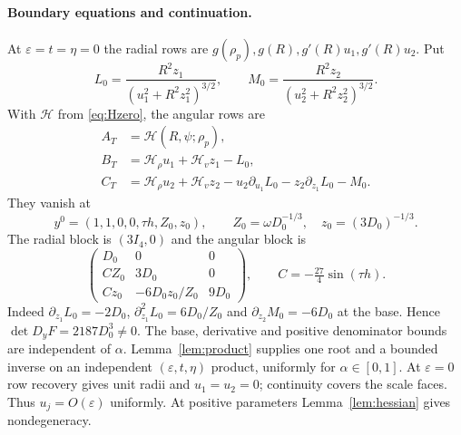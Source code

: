 \documentclass[11pt,a4paper]{article}
\numberwithin{equation}{section}
\theoremstyle{remark}
\newcommand{\eps}{\varepsilon}
\begin{document}
\paragraph{Boundary equations and continuation.}
At $\eps=t=\eta=0$ the radial rows are $g(\rho_p),g(R),g'(R)u_1,g'(R)u_2$. Put
\[
 L_0=\frac{R^2z_1}{(u_1^2+R^2z_1^2)^{3/2}},\qquad
 M_0=\frac{R^2z_2}{(u_2^2+R^2z_2^2)^{3/2}}.
\]
With $\mathcal H$ from \eqref{eq:Hzero}, the angular rows are
\begin{equation}\label{eq:nest-boundary}
 \begin{aligned}
 A_T&=\mathcal H(R,\psi;\rho_p),\\
 B_T&=\mathcal H_\rho u_1+\mathcal H_vz_1-L_0,\\
 C_T&=\mathcal H_\rho u_2+\mathcal H_vz_2-u_2\partial_{u_1}L_0-z_2\partial_{z_1}L_0-M_0.
 \end{aligned}
\end{equation}
They vanish at
\begin{equation}\label{eq:nest-base}
 y^0=(1,1,0,0,\tau h,Z_0,z_0),\qquad
 Z_0=\omega D_0^{-1/3},\quad z_0=(3D_0)^{-1/3}.
\end{equation}
The radial block is $(3I_4,0)$ and the angular block is
\begin{equation}\label{eq:nest-angle-J}
 \begin{pmatrix}
 D_0&0&0\\
 CZ_0&3D_0&0\\
 Cz_0&-6D_0z_0/Z_0&9D_0
 \end{pmatrix},\qquad C=-\tfrac{27}{4}\sin(\tau h).
\end{equation}
Indeed $\partial_{z_1}L_0=-2D_0$, $\partial_{z_1}^2L_0=6D_0/Z_0$ and $\partial_{z_2}M_0=-6D_0$ at the base. Hence $\det D_yF=2187D_0^3\ne0$. The base, derivative and positive denominator bounds are independent of $\alpha$. Lemma~\ref{lem:product} supplies one root and a bounded inverse on an independent $(\eps,t,\eta)$ product, uniformly for $\alpha\in[0,1]$. At $\eps=0$ row recovery gives unit radii and $u_1=u_2=0$; continuity covers the scale faces. Thus $u_j=O(\eps)$ uniformly. At positive parameters Lemma~\ref{lem:hessian} gives nondegeneracy.
\end{document}
